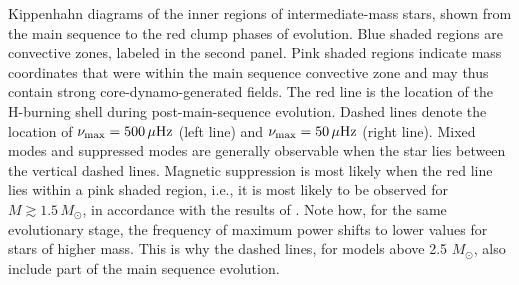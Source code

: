 \label{fig:DipoleHist}
Kippenhahn diagrams of the inner regions of intermediate-mass stars, shown from the main sequence to the red clump phases of evolution. Blue shaded regions are convective zones, labeled in the second panel. Pink shaded regions indicate mass coordinates that were within the main sequence convective zone and may thus contain strong core-dynamo-generated fields. The red line is the location of the H-burning shell during post-main-sequence evolution. Dashed lines denote the location of $\nu_{\rm max} = 500 \, \mu{\rm Hz}$ (left line) and $\nu_{\rm max} = 50 \, \mu{\rm Hz}$ (right line). Mixed modes and suppressed modes are generally observable when the star lies between the vertical dashed lines. Magnetic suppression is most likely when the red line lies within a pink shaded region, i.e., it is most likely to be observed for $M \gtrsim 1.5 \, M_\odot$, in accordance with the results of \cite{Stello_2016}. Note how, for the same evolutionary stage, the frequency of maximum power shifts to lower values for stars of higher mass.  This is why the dashed lines, for models above 2.5 $M_\odot$, also include part of the main sequence evolution.
  